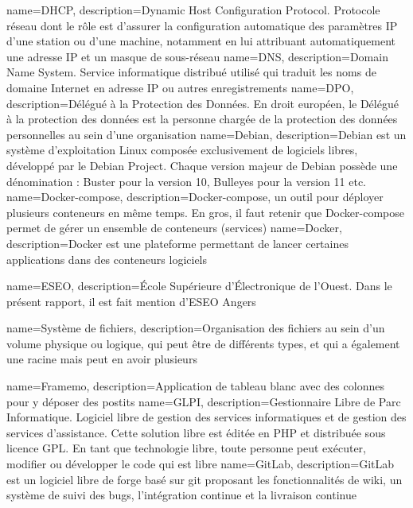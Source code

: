 {
    name=DHCP,
    description={Dynamic Host Configuration Protocol. Protocole réseau dont le rôle est d’assurer la configuration automatique des paramètres IP d’une station ou d'une machine, notamment en lui attribuant automatiquement une adresse IP et un masque de sous-réseau}
}
{
    name=DNS,
    description={Domain Name System. Service informatique distribué utilisé qui traduit les noms de domaine Internet en adresse IP ou autres enregistrements}
}
{
    name=DPO,
    description={Délégué à la Protection des Données. En droit européen, le Délégué à la protection des données est la personne chargée de la protection des données personnelles au sein d'une organisation}
}
{
    name=Debian,
    description={Debian est un système d’exploitation Linux composée exclusivement de logiciels libres, développé par le Debian Project. Chaque version majeur de Debian possède une dénomination : Buster pour la version 10, Bulleyes pour la version 11 etc.}
}
{
    name=Docker-compose,
    description={Docker-compose, un outil pour déployer plusieurs conteneurs en même temps. En gros, il faut retenir que Docker-compose permet de gérer un ensemble de conteneurs (services)}
}
{
    name=Docker,
    description={Docker est une plateforme permettant de lancer certaines applications dans des conteneurs logiciels}
}

{
    name=ESEO,
    description={École Supérieure d'Électronique de l'Ouest. Dans le présent rapport, il est fait mention d'ESEO Angers}
}

{
    name=Système de fichiers,
    description={Organisation des fichiers au sein d'un volume physique ou logique, qui peut être de différents types, et qui a également une racine mais peut en avoir plusieurs}
}

{
    name=Framemo,
    description={Application de tableau blanc avec des colonnes pour y déposer des postits}
}
{
    name=GLPI,
    description={Gestionnaire Libre de Parc Informatique. Logiciel libre de gestion des services informatiques et de gestion des services d'assistance. Cette solution libre est éditée en PHP et distribuée sous licence GPL. En tant que technologie libre, toute personne peut exécuter, modifier ou développer le code qui est libre}
}
{
    name=GitLab,
    description={GitLab est un logiciel libre de forge basé sur git proposant les fonctionnalités de wiki, un système de suivi des bugs, l’intégration continue et la livraison continue}
}

